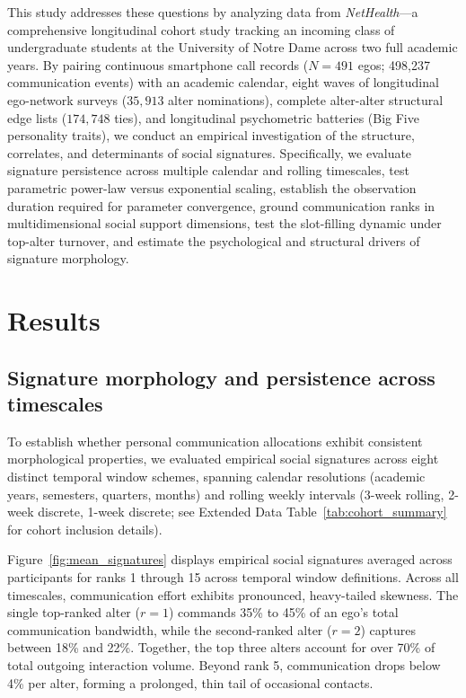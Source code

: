 \documentclass[11pt,letterpaper]{article}
\begin{document}
This study addresses these questions by analyzing data from \textit{NetHealth}---a comprehensive longitudinal cohort study tracking an incoming class of undergraduate students at the University of Notre Dame across two full academic years.\cite{liu2018network,purta2016experiences,faust2017exploring,liu2021heterogeneous} By pairing continuous smartphone call records ($N = 491$ egos; 498,237 communication events) with an academic calendar, eight waves of longitudinal ego-network surveys ($35,913$ alter nominations), complete alter-alter structural edge lists ($174,748$ ties), and longitudinal psychometric batteries (Big Five personality traits), we conduct an empirical investigation of the structure, correlates, and determinants of social signatures. Specifically, we evaluate signature persistence across multiple calendar and rolling timescales, test parametric power-law versus exponential scaling, establish the observation duration required for parameter convergence, ground communication ranks in multidimensional social support dimensions, test the slot-filling dynamic under top-alter turnover, and estimate the psychological and structural drivers of signature morphology.

\section*{Results}

\subsection*{Signature morphology and persistence across timescales}

To establish whether personal communication allocations exhibit consistent morphological properties, we evaluated empirical social signatures across eight distinct temporal window schemes, spanning calendar resolutions (academic years, semesters, quarters, months) and rolling weekly intervals (3-week rolling, 2-week discrete, 1-week discrete; see Extended Data Table~\ref{tab:cohort_summary} for cohort inclusion details). 

Figure~\ref{fig:mean_signatures} displays empirical social signatures averaged across participants for ranks 1 through 15 across temporal window definitions. Across all timescales, communication effort exhibits pronounced, heavy-tailed skewness. The single top-ranked alter ($r = 1$) commands 35\% to 45\% of an ego's total communication bandwidth, while the second-ranked alter ($r = 2$) captures between 18\% and 22\%. Together, the top three alters account for over 70\% of total outgoing interaction volume. Beyond rank 5, communication drops below 4\% per alter, forming a prolonged, thin tail of occasional contacts.
\end{document}
